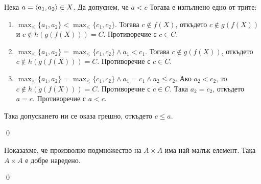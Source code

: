 \begin{tcolorbox}[mybox={Доказателство:}]
\quad
Нека $a = \langle a_1, a_2 \rangle \in X$.
Да допуснем, че $a < c$
Тогава е изпълнено едно от трите:
\begin{enumerate}[label={\arabic* сл.}]
\item
$\operatorname{max}_{\leq}\{a_1, a_2\} < \operatorname{max}_{\leq}\{c_1, c_2\}$.
Тогава $c \notin f(X)$, откъдето
$c \notin g(f(X))$ и $c \notin h(g(f(X))) = C$.
Противоречие с $c \in C$.

\item
$\operatorname{max}_{\leq}\{a_1, a_2\} = \operatorname{max}_{\leq}\{c_1, c_2\} \land a_1 < c_1$.
Тогава $c \notin g(f(X))$,
откъдето $c \notin h(g(f(X))) = C$.
Противоречие с $c \in C$.

\item
$\operatorname{max}_{\leq}\{a_1, a_2\} = \operatorname{max}_{\leq}\{c_1, c_2\} \land a_1 = c_1 \land a_2 \leq c_2$.
Ако $a_2 < c_2$, то $c \notin h(g(f(X))) = C$. Противоречие с $c \in C$.
Така $a_2 = c_2$, откъдето $a = c$.
Противоречие с $a < c$.

\end{enumerate}

\quad
Така допускането ни се оказа грешно, откъдето $c \leq a$.

\qed
\end{tcolorbox}

\quad
Показахме, че произволно подмножество на $A \times A$ има най-малък елемент. Така $A \times A$ е добре наредено.

\qed
